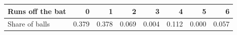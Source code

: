 \begin{tabular}{lrrrrrrr}
\toprule
Runs off the bat & 0 & 1 & 2 & 3 & 4 & 5 & 6 \\
\midrule
Share of balls & 0.379 & 0.378 & 0.069 & 0.004 & 0.112 & 0.000 & 0.057 \\
\bottomrule
\end{tabular}